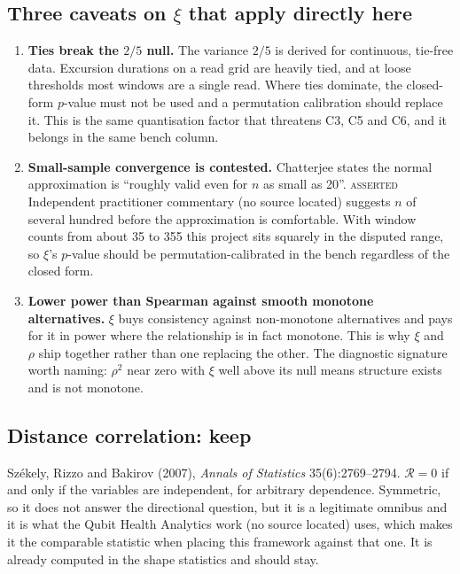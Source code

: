 \documentclass[11pt,a4paper]{article}
\newcommand{\ASSERTED}{\textsc{\textcolor{purple!70!black}{asserted}}}
\begin{document}
\subsection{Three caveats on \texorpdfstring{$\xi$}{xi} that apply directly here}

\begin{enumerate}[leftmargin=1.6em,itemsep=3pt]
\item \textbf{Ties break the $2/5$ null.} The variance $2/5$ is derived for continuous,
tie-free data. Excursion durations on a read grid are heavily tied, and at loose
thresholds most windows are a single read. Where ties dominate, the closed-form $p$-value
must not be used and a permutation calibration should replace it. This is the same
quantisation factor that threatens C3, C5 and C6, and it belongs in the same bench
column.

\item \textbf{Small-sample convergence is contested.} Chatterjee states the normal
approximation is \enquote{roughly valid even for $n$ as small as 20}. \ASSERTED{}
Independent practitioner commentary (no source located) suggests $n$ of several hundred
before the approximation is comfortable. With window counts from about 35 to 355 this project sits
squarely in the disputed range, so $\xi$'s $p$-value should be permutation-calibrated in
the bench regardless of the closed form.

\item \textbf{Lower power than Spearman against smooth monotone alternatives.} $\xi$ buys
consistency against non-monotone alternatives and pays for it in power where the
relationship is in fact monotone. This is why $\xi$ and $\rho$ ship together rather than
one replacing the other. The diagnostic signature worth naming: $\rho^2$ near zero with
$\xi$ well above its null means structure exists and is not monotone.
\end{enumerate}

\subsection{Distance correlation: keep}

Székely, Rizzo and Bakirov (2007), \emph{Annals of Statistics} 35(6):2769--2794.
$\mathcal{R} = 0$ if and only if the variables are independent, for arbitrary dependence.
Symmetric, so it does not answer the directional question, but it is a legitimate
omnibus and it is what the Qubit Health Analytics work (no source located) uses, which
makes it the
comparable statistic when placing this framework against that one. It is already computed
in the shape statistics and should stay.
\end{document}
